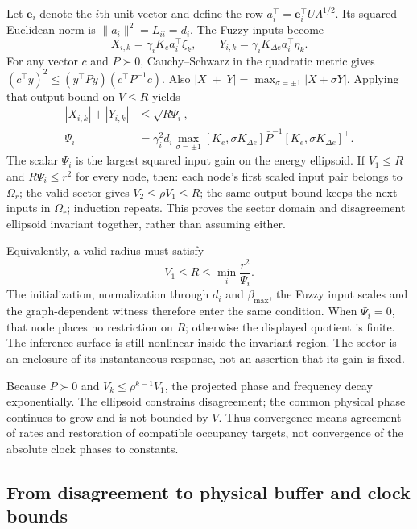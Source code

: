 Let $\mathbf e_i$ denote the $i$th unit vector and define the row
$a_i^\top=\mathbf e_i^\top U\Lambda^{1/2}$. Its squared Euclidean norm
is $\|a_i\|^2=L_{ii}=d_i$. The Fuzzy inputs become
\begin{equation}
 X_{i,k}=\gamma_iK_ea_i^\top\xi_k,\qquad
 Y_{i,k}=\gamma_iK_{\Delta e}a_i^\top\eta_k.
 \label{detail:eq:btd_d_linear_outputs}
\end{equation}
For any vector $c$ and $P\succ0$, Cauchy--Schwarz in the quadratic
metric gives $(c^\top y)^2\le(y^\top P y)(c^\top P^{-1}c)$.
Also $|X|+|Y|=\max_{\sigma=\pm1}|X+\sigma Y|$. Applying that output
bound on $V\le R$ yields
\begin{align}
 |X_{i,k}|+|Y_{i,k}|&\le\sqrt{R\Psi_i},\nonumber\\
 \Psi_i&=\gamma_i^2d_i\max_{\sigma=\pm1}
 [K_e,\sigma K_{\Delta e}]\bar P^{-1}
 [K_e,\sigma K_{\Delta e}]^\top.
 \label{detail:eq:btd_input_factor}
\end{align}
The scalar $\Psi_i$ is the largest squared input gain on the energy
ellipsoid. If $V_1\le R$ and $R\Psi_i\le r^2$ for every node, then:
each node's first scaled input pair belongs to $\Omega_r$; the valid sector gives
$V_2\le\rho V_1\le R$; the same output bound keeps the next inputs in
$\Omega_r$; induction repeats. This proves the sector domain and
disagreement ellipsoid invariant together, rather than assuming either.

Equivalently, a valid radius must satisfy
\begin{equation}
 V_1\le R\le\min_i\frac{r^2}{\Psi_i}.
 \label{detail:eq:btd_sector_radius_condition}
\end{equation}
The initialization, normalization through $d_i$ and $\beta_{\max}$, the Fuzzy input
scales and the graph-dependent witness therefore enter the same
condition. When $\Psi_i=0$, that node places no restriction on $R$;
otherwise the displayed quotient is finite. The inference surface is
still nonlinear inside the invariant region. The sector is an enclosure
of its instantaneous response, not an assertion that its gain is fixed.

Because $P\succ0$ and $V_k\le\rho^{k-1}V_1$, the projected phase and
frequency decay exponentially. The ellipsoid constrains disagreement;
the common physical phase continues to grow and is not bounded by $V$.
Thus convergence means agreement of rates and restoration of compatible
occupancy targets, not convergence of the absolute clock phases to constants.

\subsection{From disagreement to physical buffer and clock bounds}

